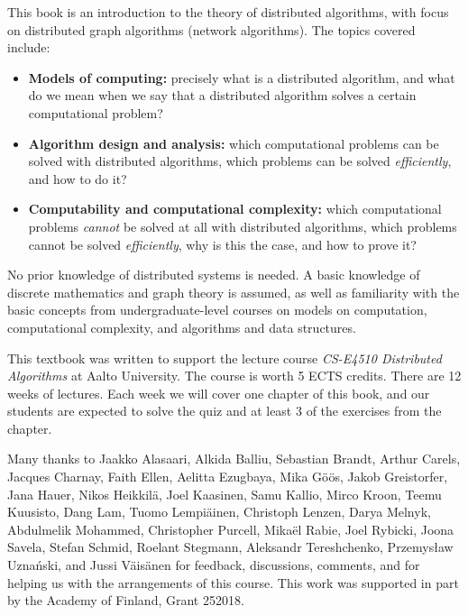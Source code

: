 
This book is an introduction to the theory of distributed algorithms, with focus on distributed graph algorithms (network algorithms). The topics covered include:
\begin{itemize}
    \item \textbf{Models of computing:} precisely what is a distributed algorithm, and what do we mean when we say that a distributed algorithm solves a certain computational problem?
    \item \textbf{Algorithm design and analysis:} which computational problems can be solved with distributed algorithms, which problems can be solved \emph{efficiently}, and how to do it?
    \item \textbf{Computability and computational complexity:} which computational problems \emph{cannot} be solved at all with distributed algorithms, which problems cannot be solved \emph{efficiently}, why is this the case, and how to prove it?
\end{itemize}
No prior knowledge of distributed systems is needed. A basic knowledge of discrete mathematics and graph theory is assumed, as well as familiarity with the basic concepts from undergraduate-level courses on models on computation, computational complexity, and algorithms and data structures.



This textbook was written to support the lecture course \emph{CS-E4510 Distributed Algorithms} at Aalto University. The course is worth 5 ECTS credits. There are 12 weeks of lectures. Each week we will cover one chapter of this book, and our students are expected to solve the quiz and at least 3 of the exercises from the chapter.



Many thanks to
Jaak\-ko Ala\-saari,
Alki\-da Balliu,
Sebastian Brandt,
Arthur Carels,
Jacques Charnay,
Faith Ellen,
Aelitta Ezugbaya,
Mika G\"o\"os,
Ja\-kob Greistorfer,
Jana Hauer,
Nikos Heik\-kil\"a,
Joel Kaa\-si\-nen,
Samu Kal\-lio,
Mir\-co Kroon,
Tee\-mu Kuu\-sisto,
Dang Lam,
Tuo\-mo Lem\-pi\"a\-inen,
Christoph Len\-zen,
Darya Melnyk,
Abdul\-melik Mohammed,
Christopher Purcell,
Mika\"el Rabie,
Joel Ry\-bicki,
Joo\-na Sa\-ve\-la,
Stefan Schmid,
Roelant Steg\-mann,
Aleksandr Tereshchenko,
Przemys\l{}aw Uzna\'nski,
and
Jussi V\"ai\-s\"a\-nen
for feedback, discussions, comments, and for helping us with the arrangements of this course. This work was supported in part by the Academy of Finland, Grant 252018.


